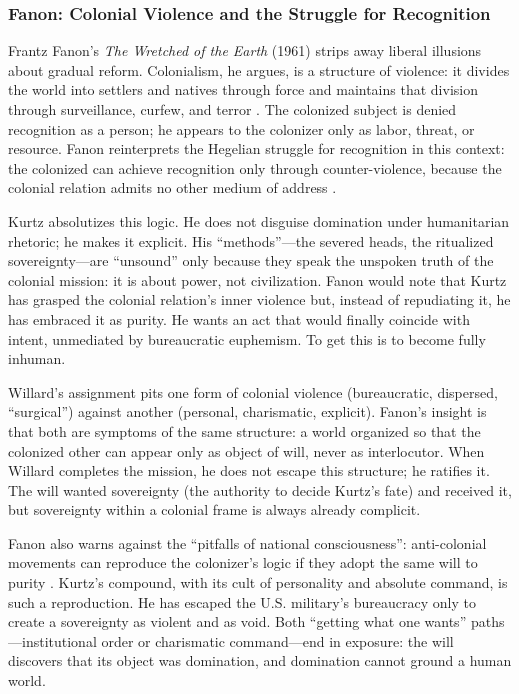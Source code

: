 \subsubsection*{Fanon: Colonial Violence and the Struggle for Recognition}
Frantz Fanon's \textit{The Wretched of the Earth} (1961) strips away liberal illusions about 
gradual reform. Colonialism, he argues, is a structure of violence: it divides the world into 
settlers and natives through force and maintains that division through surveillance, curfew, 
and terror \parencite{FanonWretched2004}. The colonized subject is denied recognition as a 
person; he appears to the colonizer only as labor, threat, or resource. Fanon reinterprets the 
Hegelian struggle for recognition in this context: the colonized can achieve recognition only 
through counter-violence, because the colonial relation admits no other medium of address 
\parencite{FanonWretched2004}.

Kurtz absolutizes this logic. He does not disguise domination under humanitarian rhetoric; he 
makes it explicit. His ``methods''---the severed heads, the ritualized sovereignty---are 
``unsound'' only because they speak the unspoken truth of the colonial mission: it is about 
power, not civilization. Fanon would note that Kurtz has grasped the colonial relation's inner 
violence but, instead of repudiating it, he has embraced it as purity. He wants an act that 
would finally coincide with intent, unmediated by bureaucratic euphemism. To get this is to 
become fully inhuman.

Willard's assignment pits one form of colonial violence (bureaucratic, dispersed, ``surgical'') 
against another (personal, charismatic, explicit). Fanon's insight is that both are symptoms 
of the same structure: a world organized so that the colonized other can appear only as object 
of will, never as interlocutor. When Willard completes the mission, he does not escape this 
structure; he ratifies it. The will wanted sovereignty (the authority to decide Kurtz's fate) 
and received it, but sovereignty within a colonial frame is always already complicit.

Fanon also warns against the ``pitfalls of national consciousness'': anti-colonial movements 
can reproduce the colonizer's logic if they adopt the same will to purity 
\parencite{FanonWretched2004}. Kurtz's compound, with its cult of personality and absolute 
command, is such a reproduction. He has escaped the U.S. military's bureaucracy only to create 
a sovereignty as violent and as void. Both ``getting what one wants'' paths---institutional 
order or charismatic command---end in exposure: the will discovers that its object was 
domination, and domination cannot ground a human world.

